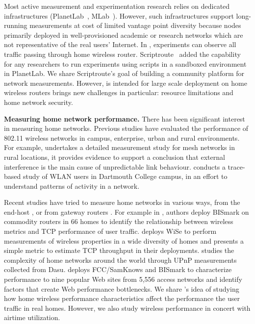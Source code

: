 Most active measurement and experimentation research relies on dedicated infrastructures (PlanetLab~\cite{chun2003planetlab}, MLab~\cite{mlab}). However, such infrastructures support long-running measurements at cost of limited vantage point diversity because nodes primarily deployed in well-provisioned academic or research networks which are not representative of the real users' Internet. In \sysname, experiments can observe all traffic passing through home wireless router. Scriptroute~\cite{spring2003scriptroute} added the capability for any researchers to run experiments using scripts in a sandboxed environment in PlanetLab. We share Scriptroute's goal of building a community platform for network measurements. However, \sysname is intended for large scale deployment on home wireless routers brings new challenges in particular: resource limitations and home network security.

\textbf{Measuring home network performance.} There has been significant interest in measuring home networks. Previous studies \cite{aguayo2004link}\cite{kotz2005analysis}\cite{raman2009feasibility} have evaluated the performance of 802.11 wireless networks in campus, enterprise, urban and rural environments. For example, \cite{raman2009feasibility} undertakes a detailed measurement study for mesh networks in rural locations, it provides evidence to support a conclusion that external interference is the main cause of unpredictable link behaviour. \cite{kotz2005analysis} conducts a trace-based study of WLAN users in Dartmouth College campus, in an effort to understand patterns of activity in a network.

Recent studies have tried to measure home networks in various ways, from the end-host \cite{chetty2011my}\cite{dicioccio2012probe}\cite{sanchez2013trying}, or from gateway routers \cite{grover2013peeking}\cite{sundaresan2015measuring}\cite{patro2013observing}\cite{sundaresan2013measuring}\cite{papagiannaki2006experimental}\cite{pefkianakis2015characterizing}. For example in \cite{sundaresan2015measuring}, authors deploy BISmark on commodity routers in 66 homes to identify the relationship between wireless metrics and TCP performance of user traffic. \cite{patro2013observing} deploys WiSe to perform measurements of wireless properties in a wide diversity of homes and presents a simple metric to estimate TCP throughput in their deployments. \cite{sanchez2013trying} studies the complexity of home networks around the world through UPnP measurements collected from Dasu. \cite{sundaresan2013measuring} deploys FCC/SamKnows and BISmark to characterize performance to nine popular Web sites from 5,556 access networks and identify factors that create Web performance bottlenecks. We share \cite{sundaresan2015measuring}'s idea of studying how home wireless performance characteristics affect the performance the user traffic in real homes. However, we also study wireless performance in concert with airtime utilization.



